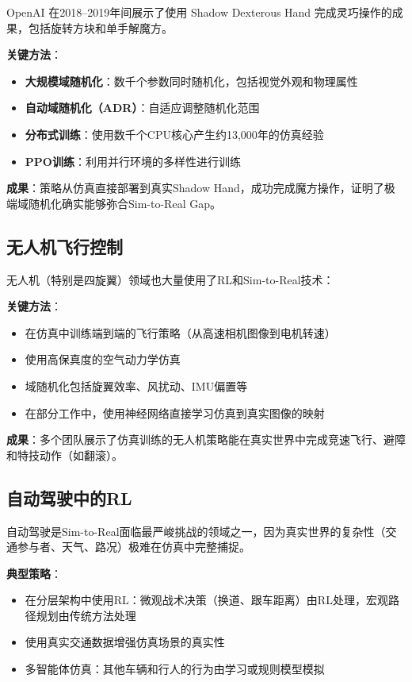 OpenAI 在2018--2019年间展示了使用 Shadow Dexterous Hand 完成灵巧操作的成果，包括旋转方块和单手解魔方。

\textbf{关键方法}：
\begin{itemize}
    \item \textbf{大规模域随机化}：数千个参数同时随机化，包括视觉外观和物理属性
    \item \textbf{自动域随机化（ADR）}：自适应调整随机化范围
    \item \textbf{分布式训练}：使用数千个CPU核心产生约13,000年的仿真经验
    \item \textbf{PPO训练}：利用并行环境的多样性进行训练
\end{itemize}

\textbf{成果}：策略从仿真直接部署到真实Shadow Hand，成功完成魔方操作，证明了极端域随机化确实能够弥合Sim-to-Real Gap。

\subsection{无人机飞行控制}

无人机（特别是四旋翼）领域也大量使用了RL和Sim-to-Real技术：

\textbf{关键方法}：
\begin{itemize}
    \item 在仿真中训练端到端的飞行策略（从高速相机图像到电机转速）
    \item 使用高保真度的空气动力学仿真
    \item 域随机化包括旋翼效率、风扰动、IMU偏置等
    \item 在部分工作中，使用神经网络直接学习仿真到真实图像的映射
\end{itemize}

\textbf{成果}：多个团队展示了仿真训练的无人机策略能在真实世界中完成竞速飞行、避障和特技动作（如翻滚）。

\subsection{自动驾驶中的RL}

自动驾驶是Sim-to-Real面临最严峻挑战的领域之一，因为真实世界的复杂性（交通参与者、天气、路况）极难在仿真中完整捕捉。

\textbf{典型策略}：
\begin{itemize}
    \item 在分层架构中使用RL：微观战术决策（换道、跟车距离）由RL处理，宏观路径规划由传统方法处理
    \item 使用真实交通数据增强仿真场景的真实性
    \item 多智能体仿真：其他车辆和行人的行为由学习或规则模型模拟
\end{itemize}

